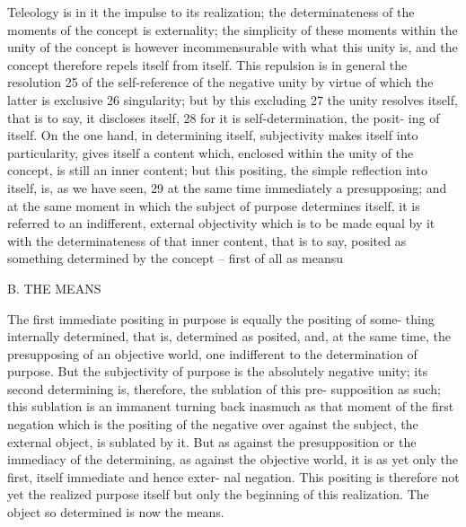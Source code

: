 Teleology
is in it the impulse to its realization; the determinateness of the moments of
the concept is externality; the simplicity of these moments within the unity
of the concept is however incommensurable with what this unity is, and the
concept therefore repels itself from itself. This repulsion is in general the
resolution 25 of the self-reference of the negative unity by virtue of which
the latter is exclusive 26 singularity; but by this excluding 27 the unity resolves
itself, that is to say, it discloses itself, 28 for it is self-determination, the posit-
ing of itself. On the one hand, in determining itself, subjectivity makes
itself into particularity, gives itself a content which, enclosed within the
unity of the concept, is still an inner content; but this positing, the simple
reflection into itself, is, as we have seen, 29 at the same time immediately
a presupposing; and at the same moment in which the subject of purpose
determines itself, it is referred to an indifferent, external objectivity which
is to be made equal by it with the determinateness of that inner content,
that is to say, posited as something determined by the concept – first of all as
meansu

B. THE MEANS

The first immediate positing in purpose is equally the positing of some-
thing internally determined, that is, determined as posited, and, at the
same time, the presupposing of an objective world, one indifferent to the
determination of purpose. But the subjectivity of purpose is the absolutely
negative unity; its second determining is, therefore, the sublation of this pre-
supposition as such; this sublation is an immanent turning back inasmuch
as that moment of the first negation which is the positing of the negative
over against the subject, the external object, is sublated by it. But as against
the presupposition or the immediacy of the determining, as against the
objective world, it is as yet only the first, itself immediate and hence exter-
nal negation. This positing is therefore not yet the realized purpose itself
but only the beginning of this realization. The object so determined is now
the means.

